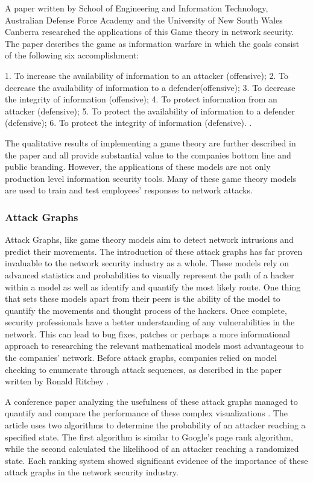 \documentclass{article}
\begin{document}
A paper written by School of Engineering and Information Technology, Australian Defense Force Academy and the University of New South Wales Canberra researched the applications of this Game theory in network security. The paper describes the game as information warfare in which the goals consist of the following six accomplishment:

    1.	To increase the availability of information to an attacker (offensive);
    2.	To decrease the availability of information to a defender(offensive);
    3.	To decrease the integrity of information (offensive);
    4.	To protect information from an attacker (defensive);
    5.	To protect the availability of information to a defender (defensive);
    6.	To protect the integrity of information (defensive).
\cite{merrick2016survey}.

The qualitative results of implementing a game theory are further described in the paper and all provide substantial value to the companies bottom line and public branding. However, the applications of these models are not only production level information security tools. Many of these game theory models are used to train and test employees’ responses to network attacks. 

\subsubsection{Attack Graphs}
Attack Graphs, like game theory models aim to detect network intrusions and predict their movements. The introduction of these attack graphs has far proven invaluable to the network security industry as a whole. These models rely on advanced statistics and probabilities to visually represent the path of a hacker within a model as well as identify and quantify the most likely route. One thing that sets these models apart from their peers is the ability of the model to quantify the movements and thought process of the hackers. Once complete, security professionals have a better understanding of any vulnerabilities in the network. This can lead to bug fixes, patches or perhaps a more informational approach to researching the relevant mathematical models most advantageous to the companies’ network. Before attack graphs, companies relied on model checking to enumerate through attack sequences, as described in the paper written by Ronald Ritchey \cite{ritchey2000using}.

A conference paper analyzing the usefulness of these attack graphs managed to quantify and compare the performance of these complex visualizations \cite{mehta2006ranking}. The article uses two algorithms to determine the probability of an attacker reaching a specified state. The first algorithm is similar to Google’s page rank algorithm, while the second calculated the likelihood of an attacker reaching a randomized state. Each ranking system showed significant evidence of the importance of these attack graphs in the network security industry. 
\end{document}
